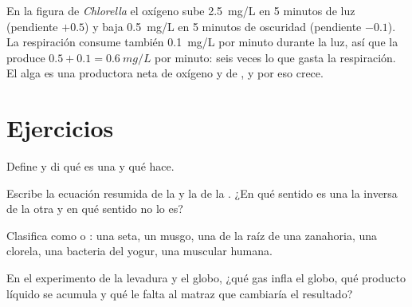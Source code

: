 \begin{example}\label{ex:g10:cell-metabolism:truerate}
En la figura de \emph{Chlorella} el oxígeno sube \qty{2.5}{mg/L} en 5
minutos de luz (pendiente $+0.5$) y baja \qty{0.5}{mg/L} en 5 minutos
de oscuridad (pendiente $-0.1$). La respiración consume también
\qty{0.1}{mg/L} por minuto durante la luz, así que la 
produce $0.5 + 0.1 = \qty{0.6}{mg/L}$ por minuto: seis veces lo que
gasta la respiración. El alga es una productora neta de oxígeno y de
, y por eso crece.
\end{example}

\section{Ejercicios}

\begin{exercise}[$\star$]\label{exo:g10:cell-metabolism:1}
Define  y di qué es una  y qué hace.
\end{exercise}

\begin{exercise}[$\star$]\label{exo:g10:cell-metabolism:2}
Escribe la ecuación resumida de la  y la de la
. ¿En qué sentido es una la inversa de la otra y en qué
sentido no lo es?
\end{exercise}

\begin{exercise}[$\star$]\label{exo:g10:cell-metabolism:3}
Clasifica como  o : una seta, un musgo, una 
de la raíz de una zanahoria, una clorela, una bacteria del yogur, una
 muscular humana.
\end{exercise}

\begin{exercise}[$\star$]\label{exo:g10:cell-metabolism:4}
En el experimento de la levadura y el globo, ¿qué gas infla el globo,
qué producto líquido se acumula y qué le falta al matraz que cambiaría
el resultado?
\end{exercise}


